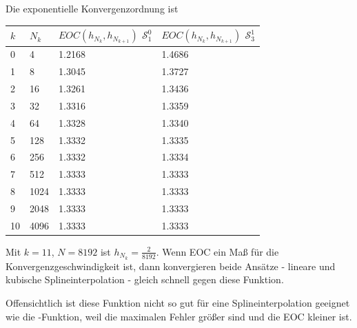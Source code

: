 \documentclass[ngerman,a4paper]{texmf/tex/latex/mathscript/mathscript}
\begin{document}
	Die exponentielle Konvergenzordnung ist
	\begin{center}
		\begin{tabular}{ll|l|l}
			$k$ & $N_k$ & $EOC(h_{N_k},h_{N_{k+1}})$ $\mathcal{S}_1^0$ & $EOC(h_{N_k},h_{N_{k+1}})$ $\mathcal{S}_3^1$ \\
			\hline
			0 & 4 & 1.2168 & 1.4686  \\
			\hline
			1 & 8 & 1.3045 & 1.3727\\
			\hline
			2 & 16 & 1.3261 & 1.3436 \\
			\hline
			3 & 32 & 1.3316 & 1.3359 \\
			\hline
			4 & 64 & 1.3328 & 1.3340 \\
			\hline
			5 & 128 & 1.3332 & 1.3335 \\
			\hline
			6 & 256 & 1.3332 & 1.3334 \\
			\hline
			7 & 512 & 1.3333 & 1.3333 \\
			\hline
			8 & 1024 & 1.3333 & 1.3333 \\
			\hline
			9 & 2048 & 1.3333 & 1.3333 \\
			\hline
			10 & 4096 & 1.3333 & 1.3333 \\
			\hline
		\end{tabular}
	\end{center}
	
	Mit $k=11$, $N=8192$ ist $h_{N_k}= \frac{2}{8192}$. Wenn EOC ein Maß für die Konvergenzgeschwindigkeit ist, dann konvergieren beide Ansätze - lineare und kubische Splineinterpolation - gleich schnell gegen diese Funktion.
	
	Offensichtlich ist diese Funktion nicht so gut für eine Splineinterpolation geeignet wie die -Funktion, weil die maximalen Fehler größer sind und die EOC kleiner ist.
\end{document}
